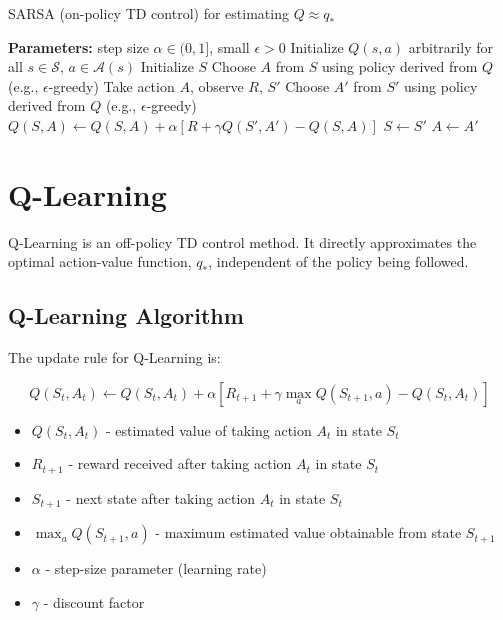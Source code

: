 \documentclass[11pt,a4paper]{article}
\begin{document}
\begin{algorithm}[H]
\caption{SARSA (on-policy TD control) for estimating $Q \approx q_*$}
\begin{algorithmic}[1]
\State \textbf{Parameters:} step size $\alpha \in (0, 1]$, small $\epsilon > 0$
\State Initialize $Q(s, a)$ arbitrarily for all $s \in \mathcal{S}$, $a \in \mathcal{A}(s)$
    \State Initialize $S$
    \State Choose $A$ from $S$ using policy derived from $Q$ (e.g., $\epsilon$-greedy)
        \State Take action $A$, observe $R$, $S'$
        \State Choose $A'$ from $S'$ using policy derived from $Q$ (e.g., $\epsilon$-greedy)
        \State $Q(S, A) \leftarrow Q(S, A) + \alpha [R + \gamma Q(S', A') - Q(S, A)]$
        \State $S \leftarrow S'$
        \State $A \leftarrow A'$
    \EndFor
\EndFor
\end{algorithmic}
\end{algorithm}

\section{Q-Learning}

Q-Learning is an off-policy TD control method. It directly approximates the optimal action-value function, $q_*$, independent of the policy being followed.

\subsection{Q-Learning Algorithm}

The update rule for Q-Learning is:

\begin{equation}
Q(S_t, A_t) \leftarrow Q(S_t, A_t) + \alpha [R_{t+1} + \gamma \max_a Q(S_{t+1}, a) - Q(S_t, A_t)]
\end{equation}

\begin{tcolorbox}[title=Notation Overview]
\begin{itemize}
    \item $Q(S_t, A_t)$ - estimated value of taking action $A_t$ in state $S_t$
    \item $R_{t+1}$ - reward received after taking action $A_t$ in state $S_t$
    \item $S_{t+1}$ - next state after taking action $A_t$ in state $S_t$
    \item $\max_a Q(S_{t+1}, a)$ - maximum estimated value obtainable from state $S_{t+1}$
    \item $\alpha$ - step-size parameter (learning rate)
    \item $\gamma$ - discount factor
\end{itemize}
\end{tcolorbox}
\end{document}
